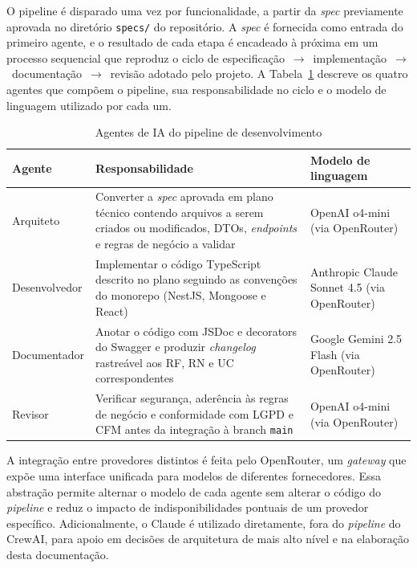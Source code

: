 O pipeline é disparado uma vez por funcionalidade, a
partir da \textit{spec} previamente aprovada no
diretório \texttt{specs/} do repositório. A
\textit{spec} é fornecida como entrada do
primeiro agente, e o resultado de cada etapa é
encadeado à próxima em um processo sequencial que
reproduz o ciclo de especificação~$\rightarrow$~implementação~$\rightarrow$~documentação~$\rightarrow$~revisão
adotado pelo projeto. A
Tabela~\ref{tab:ai-agents} descreve os quatro agentes
que compõem o pipeline, sua responsabilidade no ciclo
e o modelo de linguagem utilizado por cada um.

\begin{table}[H]
  \centering
  \caption{Agentes de IA do pipeline de desenvolvimento}
  \label{tab:ai-agents}
  \begin{tabular}{p{2.6cm}p{5.2cm}p{5.6cm}}
    \toprule
    \textbf{Agente} &
    \textbf{Responsabilidade} &
    \textbf{Modelo de linguagem} \\
    \midrule
    Arquiteto
      & Converter a \textit{spec} aprovada em plano
        técnico contendo arquivos a serem criados ou
        modificados, DTOs, \textit{endpoints} e regras
        de negócio a validar
      & OpenAI o4-mini (via OpenRouter) \\
    \midrule
    Desenvolvedor
      & Implementar o código TypeScript descrito no
        plano seguindo as convenções do monorepo
        (NestJS, Mongoose e React)
      & Anthropic Claude Sonnet 4.5
        (via OpenRouter) \\
    \midrule
    Documentador
      & Anotar o código com JSDoc e decorators do
        Swagger e produzir \textit{changelog}
        rastreável aos RF, RN e UC correspondentes
      & Google Gemini 2.5 Flash
        (via OpenRouter) \\
    \midrule
    Revisor
      & Verificar segurança, aderência às regras de
        negócio e conformidade com LGPD e CFM
        antes da integração à branch
        \texttt{main}
      & OpenAI o4-mini (via OpenRouter) \\
    \bottomrule
  \end{tabular}
\end{table}

A integração entre provedores distintos é feita pelo
OpenRouter, um \textit{gateway} que expõe uma interface
unificada para modelos de diferentes fornecedores. Essa
abstração permite alternar o modelo de cada agente sem
alterar o código do \textit{pipeline} e reduz o impacto
de indisponibilidades pontuais de um provedor
específico. Adicionalmente, o Claude é utilizado
diretamente, fora do \textit{pipeline} do CrewAI, para
apoio em decisões de arquitetura de mais alto nível e
na elaboração desta documentação.

